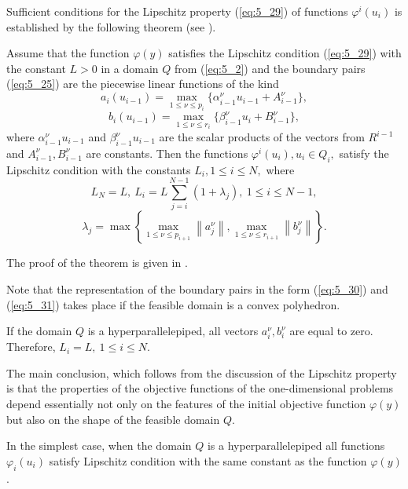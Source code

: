 Sufficient conditions for the Lipschitz property (\ref{eq:5_29})  of functions $\varphi^i(u_i)$  is established by the following theorem (see \cite{5_StrMonRus}).
\begin{theorem}
\label{theor:5_1}
Assume that the function $\varphi(y)$ satisfies the Lipschitz condition (\ref{eq:5_29})  with the constant $L>0$ in a domain $Q$ from (\ref{eq:5_2}) and the boundary pairs (\ref{eq:5_25}) are the piecewise linear functions of the kind 
\begin{equation}
\label{eq:5_30}
a_i(u_{i-1})=\max_{1\leq\nu \leq p_i}\{\alpha_{i-1}^\nu u_{i-1}+A_{i-1}^\nu\},
\end{equation}
\begin{equation}
\label{eq:5_31}
b_i(u_{i-1})=\max_{1\leq\nu \leq r_i}\{\beta_{i-1}^\nu u_i+B_{i-1}^\nu\},
\end{equation}
where  $\alpha_{i-1}^\nu u_{i-1}$ and $\beta_{i-1}^\nu u_{i-1}$ are the scalar products of the vectors from $R^{i-1}$  and $A_{i-1}^\nu, B_{i-1}^\nu$ are constants. Then the functions $\varphi^i(u_i),u_i\in Q_i,$ satisfy the Lipschitz condition with the constants $L_i,1\leq i\leq N,$ 
where
\begin{displaymath}
L_N=L,\:L_i=L\sum_{j=i}^{N-1}{(1+\lambda_j)},\:1\leq i\leq N-1,
\end{displaymath}
\begin{displaymath}
\lambda_j=\max\left\{\max_{1\leq \nu\leq p_{i+1}}\left\|a_j^\nu\right\|,\max_{1\leq \nu\leq r_{i+1}}\left\|b_j^\nu\right\| \right\}.
\end{displaymath}
\end{theorem}

The proof of the theorem is given in \cite{5_StrMonRus}.

Note that the representation of the boundary pairs in the form (\ref{eq:5_30}) and (\ref{eq:5_31}) takes place if the feasible domain is a convex polyhedron. 

If the domain $Q$ is a hyperparallelepiped, all vectors $a_i^\nu,b_i^\nu$ are equal to zero. Therefore, $L_i=L,\:1\leq i\leq N$.

The main conclusion, which follows from the discussion of the Lipschitz property is that the properties of the objective functions of the one-dimensional problems depend essentially not only on the features of the initial objective function $\varphi(y)$  but also on the shape of the feasible domain $Q$.

In the simplest case, when the domain $Q$ is a hyperparallelepiped all functions $\varphi_i(u_i)$  satisfy Lipschitz condition with the same constant as the function $\varphi(y)$.

